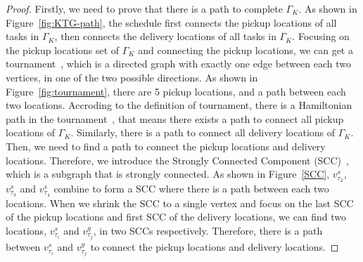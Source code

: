 \documentclass[sigconf,anonymous]{aamas}
\begin{document}
\begin{proof}
    Firstly, we need to prove that there is a path to complete $\Gamma_K$.
    As shown in Figure~\ref{fig:KTG-path},
    the schedule first connects the pickup locations of all tasks in $\Gamma_K$,
    then connects the delivery locations of all tasks in $\Gamma_K$.
    Focusing on the pickup locations set of $\Gamma_K$
    and connecting the pickup locations,
    we can get a tournament~\cite{enwiki:1234378036}, 
    which is a directed graph with exactly one edge between each two vertices, 
    in one of the two possible directions.
    As shown in Figure~\ref{fig:tournament}, 
    there are 5 pickup locations,
    and a path between each two locations.
    Accroding to the definition of tournament,
    there is a Hamiltonian path in the tournament~\cite{enwiki:1234378036},
    that means there exists a path to connect all pickup locations of $\Gamma_K$.
    Similarly, there is a path to connect all delivery locations of $\Gamma_K$.
    Then, we need to find a path to connect the pickup locations and delivery locations.
    Therefore, we introduce the Strongly Connected Component (SCC)~\cite{SCC},
    which is a subgraph that is strongly connected.
    As shown in Figure~\ref{SCC},
    $v^{s}_{\tau_{2}}$, $v^{s}_{\tau_{3}}$ and $v^{s}_{\tau_{4}}$ combine  to form a SCC
    where there is a path between each two locations.
    When we shrink the SCC to a single vertex 
    and focus on the last SCC of the pickup locations and first SCC of the delivery locations,
    we can find two locations, $v^{s}_{\tau_{i}}$ and $v^{g}_{\tau_{j}}$, in two SCCs respectively.
    Therefore, there is a path between $v^{s}_{\tau_{i}}$ and $v^{g}_{\tau_{j}}$ 
    to connect the pickup locations and delivery locations.


\end{proof}
\end{document}
